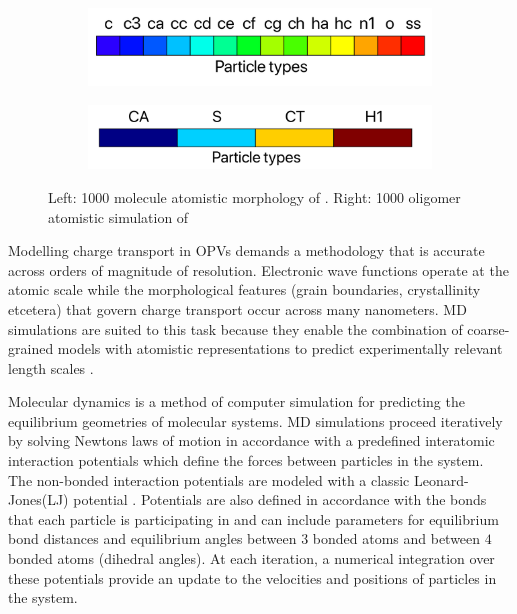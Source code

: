 \begin{figure}
\begin{subfigure}{.5\textwidth}
\centering
    \includegraphics[width=.7\textwidth]{figures/itic-legend.png}
\end{subfigure}%
\begin{subfigure}{.5\textwidth}
\centering
    \includegraphics[width=.7\textwidth]{figures/color-legend-p3ht.png}
\end{subfigure}
    \caption{Left: 1000 molecule atomistic morphology of . Right: 1000 oligomer atomistic simulation
    of }
\label{ITIC/P3HT}
\end{figure}

Modelling charge transport in OPVs demands a methodology that is accurate across orders of magnitude of
resolution. Electronic wave functions operate at the atomic scale while the morphological features (grain
boundaries, crystallinity etcetera) that govern charge transport occur across many nanometers. MD simulations
are suited to this task because they enable the combination of coarse-grained models with atomistic
representations to predict experimentally relevant length scales \cite{Miller2018}.

Molecular dynamics is a method of computer simulation for predicting the equilibrium geometries of molecular
systems. MD simulations proceed iteratively by solving Newtons laws of motion
in accordance with a predefined interatomic interaction potentials which define the forces between particles
in the system.  
The non-bonded interaction potentials are modeled with a classic Leonard-Jones(LJ)
potential \cite{Jones1924a}. Potentials are also defined in accordance with the bonds that each particle is
participating in and can include parameters for equilibrium bond distances and equilibrium angles between
$3$ bonded atoms and between $4$ bonded atoms (dihedral angles).
At each iteration, a numerical integration over these potentials provide an update to the velocities and positions
of particles in the system. 


